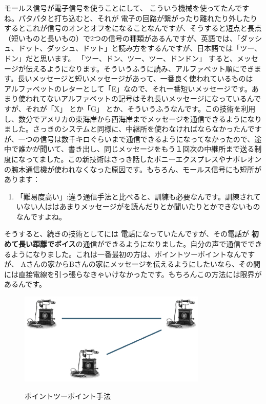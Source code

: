モールス信号が電子信号を使うことにして、
こういう機械を使ってたんですね。パタパタと打ち込むと、それが
電子の回路が繋がったり離れたり外したりするとこれが信号のオンとオフをになることなんですが、そうすると短点と長点（短いものと長いもの）で2つの信号の種類があるんですが、英語では、「ダッシュ、ドット、ダッシュ、ドット」と読み方をするんですが、日本語では「ツー、ドン」だと思います。
「ツー、ドン、ツー、ツー、ドンドン」
すると、メッセージが伝えるようになります。そういうふうに読み、アルファベット順にできます。長いメッセージと短いメッセージがあって、一番良く使われているものは
アルファベットのレターとして「E」なので、それ一番短いメッセージです。あまり使われてないアルファベットの記号はそれ長いメッセージになっているんですが、それが「X」 とか「G」 とか、そういうふうなんです。この技術を利用し、数分でアメリカの東海岸から西海岸までメッセージを通信できるようになりました。さっきのシステムと同様に、中継所を使わなければならなかったんですが、一つの信号は数千キロぐらいまで通信できるようになってなかったので、途中で誰かが聞いて、書き出し、同じメッセージをもう１回次の中継所まで送る制度になってました。この新技術はさっき話したポニーエクスプレスやナポレオンの腕木通信機が使われなくなった原因です。もちろん、モールス信号にも短所があります：
\begin{enumerate}
    \item 「難易度高い」:違う通信手法と比べると、訓練も必要なんです。訓練されていない人ははあまりメッセージがを読んだりとか聞いたりとかできないものなんですよね。
\end{enumerate}

そうすると、続きの技術としてには 電話になっていたんですが、その電話が
\textbf{初めて長い距離でボイス}の通信ができるようになりました。自分の声で通信でできるようになりました。これは一番最初の方は、ポイントツーポイントなんですが、 Aさんの家からBさんの家にメッセージを伝えるようにしたいなら、その間には直接電線を引っ張らなきゃいけなかったです。もちろんこの方法には限界があるんです。
\begin{figure}[H]
    \includegraphics[width=0.8\textwidth]{lesson1/pointpoint.eps}
    \label{fig: 1}
    \caption{ポイントツーポイント手法}
\end{figure}


